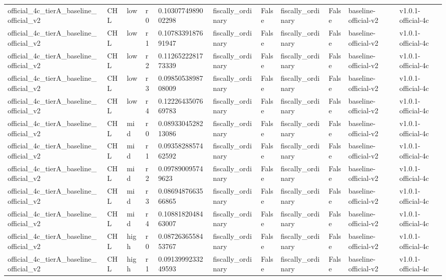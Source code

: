 \begin{landscape}
\begin{longtable}{lllllllllll}
official\_4c\_tierA\_baseline\_official\_v2 & CHL & low & r0 & 0.1030774989002298 & fiscally\_ordinary & False & fiscally\_ordinary & False & baseline-official-v2 & v1.0.1-official-4c \\
official\_4c\_tierA\_baseline\_official\_v2 & CHL & low & r1 & 0.1078339187691947 & fiscally\_ordinary & False & fiscally\_ordinary & False & baseline-official-v2 & v1.0.1-official-4c \\
official\_4c\_tierA\_baseline\_official\_v2 & CHL & low & r2 & 0.1126522281773339 & fiscally\_ordinary & False & fiscally\_ordinary & False & baseline-official-v2 & v1.0.1-official-4c \\
official\_4c\_tierA\_baseline\_official\_v2 & CHL & low & r3 & 0.0985053898708009 & fiscally\_ordinary & False & fiscally\_ordinary & False & baseline-official-v2 & v1.0.1-official-4c \\
official\_4c\_tierA\_baseline\_official\_v2 & CHL & low & r4 & 0.1222643507669783 & fiscally\_ordinary & False & fiscally\_ordinary & False & baseline-official-v2 & v1.0.1-official-4c \\
official\_4c\_tierA\_baseline\_official\_v2 & CHL & mid & r0 & 0.0893304528213086 & fiscally\_ordinary & False & fiscally\_ordinary & False & baseline-official-v2 & v1.0.1-official-4c \\
official\_4c\_tierA\_baseline\_official\_v2 & CHL & mid & r1 & 0.0935828857462592 & fiscally\_ordinary & False & fiscally\_ordinary & False & baseline-official-v2 & v1.0.1-official-4c \\
official\_4c\_tierA\_baseline\_official\_v2 & CHL & mid & r2 & 0.097890095749623 & fiscally\_ordinary & False & fiscally\_ordinary & False & baseline-official-v2 & v1.0.1-official-4c \\
official\_4c\_tierA\_baseline\_official\_v2 & CHL & mid & r3 & 0.0869487663566865 & fiscally\_ordinary & False & fiscally\_ordinary & False & baseline-official-v2 & v1.0.1-official-4c \\
official\_4c\_tierA\_baseline\_official\_v2 & CHL & mid & r4 & 0.1088182048463007 & fiscally\_ordinary & False & fiscally\_ordinary & False & baseline-official-v2 & v1.0.1-official-4c \\
official\_4c\_tierA\_baseline\_official\_v2 & CHL & high & r0 & 0.0872636558453767 & fiscally\_ordinary & False & fiscally\_ordinary & False & baseline-official-v2 & v1.0.1-official-4c \\
official\_4c\_tierA\_baseline\_official\_v2 & CHL & high & r1 & 0.0913999233249593 & fiscally\_ordinary & False & fiscally\_ordinary & False & baseline-official-v2 & v1.0.1-official-4c \\

\end{longtable}
\end{landscape}
